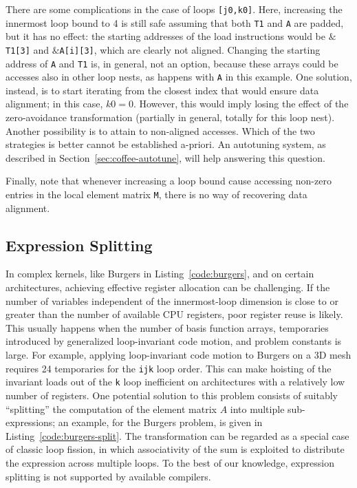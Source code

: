 There are some complications in the case of loops \texttt{[j0,k0]}. Here, increasing the innermost loop bound to 4 is still safe assuming that both \texttt{T1} and \texttt{A} are padded, but it has no effect: the starting addresses of the load instructions would be \texttt{$\&$T1[3]} and \texttt{$\&$A[i][3]}, which are clearly not aligned. Changing the starting address of \texttt{A} and \texttt{T1} is, in general, not an option, because these arrays could be accesses also in other loop nests, as happens with \texttt{A} in this example. One solution, instead, is to start iterating from the closest index that would ensure data alignment; in this case, $k0=0$. However, this would imply losing the effect of the zero-avoidance transformation (partially in general, totally for this loop nest). Another possibility is to attain to non-aligned accesses. Which of the two strategies is better cannot be established a-priori. An autotuning system, as described in Section~\ref{sec:coffee-autotune}, will help answering this question.

Finally, note that whenever increasing a loop bound cause accessing non-zero entries in the local element matrix \texttt{M}, there is no way of recovering data alignment.

\subsection{Expression Splitting}
\label{sec:coffee-split}

In complex kernels, like Burgers in Listing~\ref{code:burgers}, and on certain architectures, achieving effective register allocation can be challenging. If the number of variables independent of the innermost-loop dimension is close to or greater than the number of available CPU registers, poor register reuse is likely. This usually happens when the number of basis function arrays, temporaries introduced by generalized loop-invariant code motion, and problem constants is large. For example, applying loop-invariant code motion to Burgers on a 3D mesh requires 24 temporaries for the \texttt{ijk} loop order. This can make hoisting of the invariant loads out of the \texttt{k} loop inefficient on architectures with a relatively low number of registers. One potential solution to this problem consists of suitably ``splitting'' the computation of the element matrix $A$ into multiple sub-expressions; an example, for the Burgers problem, is given in Listing~\ref{code:burgers-split}. The transformation can be regarded as a special case of classic loop fission, in which associativity of the sum is exploited to distribute the expression across multiple loops. To the best of our knowledge, expression splitting is not supported by available compilers.

